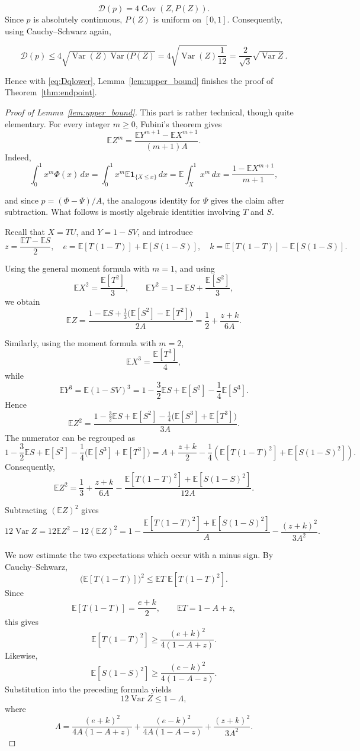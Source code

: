 \documentclass[final,12pt]{elsarticle}
\numberwithin{equation}{section}
\theoremstyle{remark}
\newcommand{\E}{\mathbb E}
\newcommand{\Var}{\operatorname{Var}}
\newcommand{\Cov}{\operatorname{Cov}}
\newcommand{\Gini}{\mathcal D}
\theoremstyle{definition}
\begin{document}
$$ \Gini(p)=4\Cov(Z,P(Z)).$$
Since $p$ is absolutely continuous, $P(Z)$ is uniform on $[0,1]$. Consequently, using Cauchy--Schwarz again,

$$ \Gini(p) \le 4 \sqrt{\Var(Z) \Var(P(Z)} = 4\sqrt{\Var(Z) \frac{1}{12}}
 = \frac2{\sqrt3}\sqrt{\Var Z}.$$

Hence with \eqref{eq:Dqlower}, Lemma~\ref{lem:upper_bound} finishes the proof of Theorem~\ref{thm:endpoint}.

\begin{proof}[Proof of Lemma~\ref{lem:upper_bound}]
This part is rather technical, though quite elementary. For every integer $m\ge0$, Fubini's theorem gives
$$
 \E Z^m
 =\frac{\E Y^{m+1}-\E X^{m+1}}{(m+1)A}.
$$
Indeed, 
$$
 \int_0^1x^m\Phi(x)\,dx = \int_0^1x^m\E\mathbf 1_{\{X\leq x\}}\,dx
 =\E\int_X^1x^m\,dx
 =\frac{1-\E X^{m+1}}{m+1},
$$


and since $p=(\Phi-\Psi)/A$, the analogous identity for $\Psi$ gives the claim after subtraction. What follows is mostly algebraic identities involving $T$ and $S$.

 Recall that $X = TU$, and $Y = 1 -SV$, and introduce
$$
 z=\frac{\E T-\E S}{2},\quad
 e=\E[T(1-T)]+\E[S(1-S)],\quad
 k=\E[T(1-T)]-\E[S(1-S)].
$$


Using the general moment formula with $m=1$, and using
$$
 \E X^2=\frac{\E[T^2]}{3},
 \qquad
 \E Y^2
 =1-\E S+\frac{\E[S^2]}{3},
$$
we obtain
$$
 \E Z
 =
 \frac{
  1-\E S+\frac13\bigl(\E[S^2]-\E[T^2]\bigr)
 }{2A} =\frac12+\frac{z+k}{6A}.
$$

Similarly, using the moment formula with $m=2$,
$$
 \E X^3=\frac{\E[T^3]}4,
$$
while
$$
 \E Y^3
 =
 \E(1-SV)^3
 =
 1-\frac32\E S+\E[S^2]-\frac14\E[S^3].
$$
Hence
$$
 \E Z^2
 =
 \frac{
  1-\frac32\E S+\E[S^2]
  -\frac14\bigl(\E[S^3]+\E[T^3]\bigr)
 }{3A}.
$$
The numerator can be regrouped as
$$
 1-\frac32\E S+\E[S^2]
  -\frac14\bigl(\E[S^3]+\E[T^3]\bigr) =
 A+\frac{z+k}{2}
 -\frac14\left(
   \E[T(1-T)^2]+\E[S(1-S)^2]
 \right). $$
Consequently,
$$
 \E Z^2
 =
 \frac13+\frac{z+k}{6A}
 -\frac{
   \E[T(1-T)^2]+\E[S(1-S)^2]
 }{12A}.
$$

Subtracting $(\E Z)^2$ gives
$$ 12\Var Z =
 12\E Z^2-12(\E Z)^2 = 1 -\frac{\E[T(1-T)^2]+\E[S(1-S)^2]}{A} -\frac{(z+k)^2}{3A^2}.$$

We now estimate the two expectations which occur with a minus sign.
By Cauchy--Schwarz,
$$
 \bigl(\E[T(1-T)]\bigr)^2
 \le
 \E T\;\E[T(1-T)^2].
$$
Since
$$
 \E[T(1-T)]=\frac{e+k}{2},
 \qquad
 \E T=1-A+z,
$$
this gives
$$
 \E[T(1-T)^2]
 \ge
 \frac{(e+k)^2}{4(1-A+z)}.
$$
Likewise,
$$
 \E[S(1-S)^2]
 \ge
 \frac{(e-k)^2}{4(1-A-z)}.
$$
Substitution into the preceding formula yields
$$
 12\Var Z\le 1-\Lambda,
$$
where
$$
 \Lambda=
 \frac{(e+k)^2}{4A(1-A+z)}
 +\frac{(e-k)^2}{4A(1-A-z)}
 +\frac{(z+k)^2}{3A^2}.
$$



\end{proof}
\end{document}
